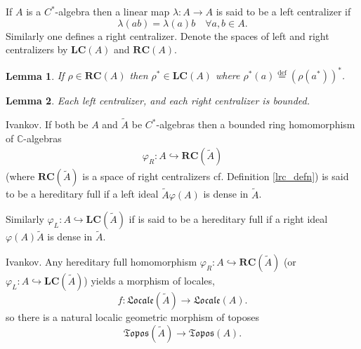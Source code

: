 \documentclass{beamer}
\theoremstyle{plain}
\newtheorem{lem}{Lemma}%
\newcommand{\bean}{\begin{eqnarray*}}
\newcommand{\eean}{\end{eqnarray*}}
\newcommand{\be}{\begin{equation}}
\newcommand{\ee}{\end{equation}}
\newcommand{\C}{\mathbb{C}}
\newcommand{\la}{\lambda}
\newcommand{\bydef}{\stackrel{\mathrm{def}}{=}}
\newcommand{\hookto}{\hookrightarrow}        %
\begin{document}
\begin{frame}
	\begin{definition}\label{lrc_defn}
	If $A$ is a $C^*$-algebra then a linear map $\la: A\to A$ is said to be a \alert{left centralizer} if
	\be
	\la\left(ab\right)= 	\la\left(a\right) b \quad \forall a, b \in A.
	\ee
	Similarly one defines a \alert{right} centralizer. Denote the spaces of left and right centralizers by $\mathbf{LC}(A)$ and  $\mathbf{RC}(A)$.
\end{definition}
\begin{lem}
	If $\rho\in  \mathbf{RC}(A)$ then $\rho^*\in  \mathbf{LC}(A)$ where $\rho^*\left(a \right)\bydef \left(\rho\left( a^* \right) \right)^*$. 
\end{lem}


\begin{lem}\label{lrc_lem}
	Each left centralizer, and each right centralizer is bounded.
\end{lem}

\end{frame}
\begin{frame}
\begin{definition}\label{hereditary_full_defn}
\alert{Ivankov}.	If both be $A$ and $\widetilde{A}$ be $C^*$-algebras then  a bounded ring homomorphism of $\C$-algebras
	\bean
	\varphi_R: A \hookto \mathbf{RC}\left(\widetilde A\right)
	\eean
	(where $\mathbf{RC}\left(\widetilde A\right)$ is a space of right centralizers cf. Definition \ref{lrc_defn}) is said to be a \alert{hereditary full} if  a left ideal $\widetilde{A} \varphi\left(A \right)$  is dense in $\widetilde{A}$.
	
	Similarly $\varphi_L: A \hookto \mathbf{LC}\left(\widetilde A\right)$ if is said to be a \alert{hereditary full} if  a right ideal $ \varphi\left(A \right)\widetilde{A}$  is dense in $\widetilde{A}$.
	
\end{definition}
\end{frame}
\begin{frame}
\begin{lemma}\label{locale_lem} 
\alert{Ivankov}.	Any hereditary full homomorphism $\varphi_R: A \hookto \mathbf{RC}\left(\widetilde A\right)$ (or $\varphi_L: A \hookto \mathbf{LC}\left(\widetilde A\right)$)  yields a morphism of locales,
	$$
f: \mathfrak{Locale}\left( \widetilde A\right)\xrightarrow{ }\mathfrak{Locale}\left( A\right).
	$$
so there is  a natural localic geometric  morphism of toposes 
	$$\mathfrak{Topos}\left( \widetilde A\right)\xrightarrow{}\mathfrak{Topos}\left( A\right).$$ 
\end{lemma}
\end{frame}
\end{document}

